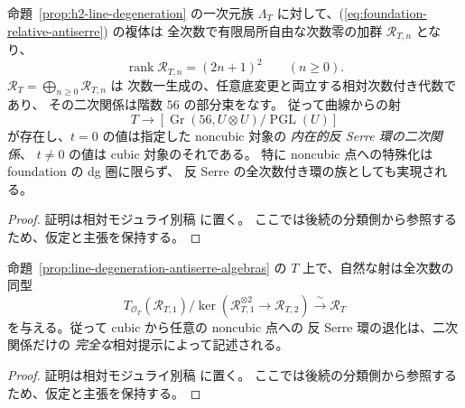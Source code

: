 \begin{proposition}
\label{prop:line-degeneration-antiserre-algebras}
命題~\ref{prop:h2-line-degeneration} の一次元族
$\Lambda_T$ に対して、(\ref{eq:foundation-relative-antiserre}) の複体は
全次数で有限局所自由な次数零の加群 $\mathscr R_{T,n}$ となり、
\[
 \operatorname{rank}\mathscr R_{T,n}=(2n+1)^2
 \qquad(n\ge0).
\]
$\mathscr R_T=\bigoplus_{n\ge0}\mathscr R_{T,n}$ は
次数一生成の、任意底変更と両立する相対次数付き代数であり、
その二次関係は階数 $56$ の部分束をなす。
従って曲線からの射
\[
 T\longrightarrow
 \left[\operatorname{Gr}(56,U\otimes U)/\operatorname{PGL}(U)\right]
 \tag{D-Gr}\label{eq:line-antiserre-grassmann}
\]
が存在し、$t=0$ の値は指定した noncubic 対象の
\emph{内在的反 Serre 環の二次関係}、
$t\ne0$ の値は cubic 対象のそれである。
特に noncubic 点への特殊化は foundation の dg 圏に限らず、
反 Serre の全次数付き環の族としても実現される。
\end{proposition}
\begin{proof}
証明は相対モジュライ別稿 \cite[\texttt{foundation_stack} 節]{QuadricModuli2026} に置く。
ここでは後続の分類側から参照するため、仮定と主張を保持する。
\end{proof}

\begin{corollary}
\label{cor:line-full-quadratic-degeneration}
命題~\ref{prop:line-degeneration-antiserre-algebras} の
$T$ 上で、自然な射は全次数の同型
\[
 T_{\mathcal O_T}(\mathscr R_{T,1})/
 \ker(\mathscr R_{T,1}^{\otimes2}\to\mathscr R_{T,2})
   \xrightarrow{\ \sim\ }\mathscr R_T
 \tag{D-quad}\label{eq:line-full-quadratic}
\]
を与える。従って cubic から任意の noncubic 点への
反 Serre 環の退化は、二次関係だけの
\emph{完全な}相対提示によって記述される。
\end{corollary}
\begin{proof}
証明は相対モジュライ別稿 \cite[\texttt{foundation_stack} 節]{QuadricModuli2026} に置く。
ここでは後続の分類側から参照するため、仮定と主張を保持する。
\end{proof}

